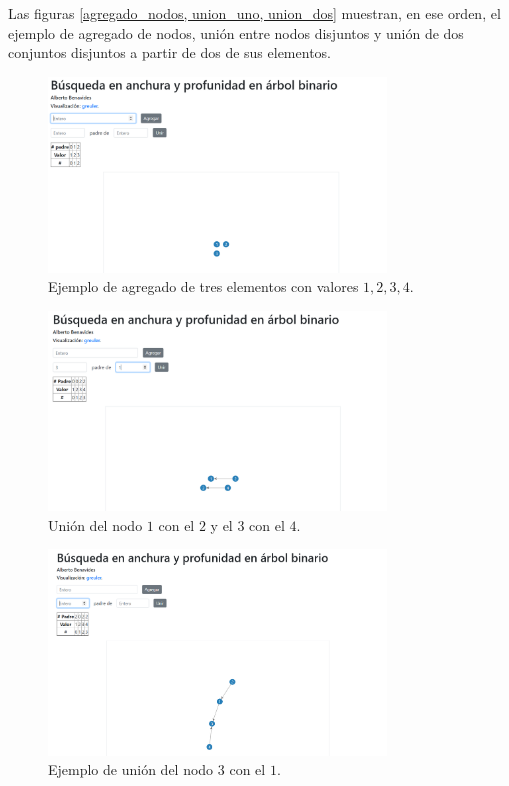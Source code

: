 \documentclass[paper=leter, fontsize=11pt]{scrartcl}
\numberwithin{equation}{section}		%
\numberwithin{figure}{section}			%
\numberwithin{table}{section}				%
\begin{document}
Las figuras \ref{agregado_nodos, union_uno, union_dos} muestran, en ese orden, el ejemplo de agregado de nodos, unión entre nodos disjuntos y unión de dos conjuntos disjuntos a partir de dos de sus elementos.

\begin{figure}
    \centering
    \includegraphics[width=0.8\textwidth]{2.png}
    \caption{Ejemplo de agregado de tres elementos con valores $1, 2, 3, 4$.}
    \label{agregado_nodos}
\end{figure}

\begin{figure}
    \centering
    \includegraphics[width=0.8\textwidth]{5.png}
    \caption{Unión del nodo $1$ con el $2$ y el $3$ con el $4$.}
    \label{union_uno}
\end{figure}

\begin{figure}
    \centering
    \includegraphics[width=0.8\textwidth]{6.png}
    \caption{Ejemplo de unión del nodo $3$ con el $1$.}
    \label{union_dos}
\end{figure}



\end{document}

